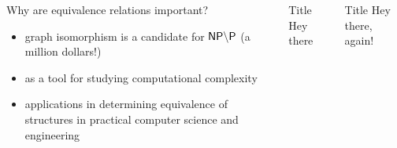 \documentclass[final]{beamer}
\begin{document}
\begin{frame}{}
\begin{columns}[t]
\begin{column}{.3\linewidth}
      \begin{block}{\LARGE Why are equivalence relations important?}
        \begin{itemize}
          \Large
        \item graph isomorphism is a candidate for ${\mathsf{NP}}\backslash{\ensuremath{\mathsf{P}}}$ (a million
          dollars!)
        \item as a tool for studying computational complexity
        \item applications in determining equivalence of structures in
          practical computer science and engineering
        \end{itemize}
      \end{block}
    \end{column}

    \begin{column}{.3\linewidth}
      \begin{block}{\large Title}
        Hey there
      \end{block}
    \end{column}

    \begin{column}{.3\linewidth}
      \begin{block}{\large Title}
        Hey there, again!
      \end{block}
    \end{column}
  \end{columns}
\end{frame}
\end{document}
